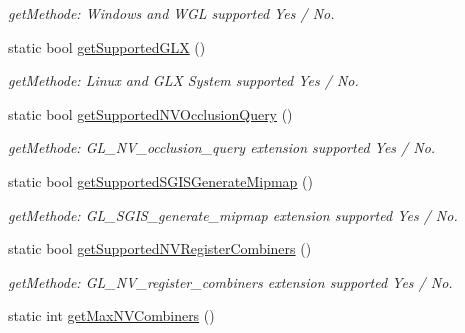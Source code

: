 \begin{DoxyCompactItemize}
\begin{DoxyCompactList}\small\item\em getMethode: Windows and WGL supported Yes / No. \item\end{DoxyCompactList}\item 
\hypertarget{class_f2_c_1_1_shader_g_l_a634e417f6f4511cbecf65fe077e6e740}{
static bool \hyperlink{class_f2_c_1_1_shader_g_l_a634e417f6f4511cbecf65fe077e6e740}{getSupportedGLX} ()}
\label{class_f2_c_1_1_shader_g_l_a634e417f6f4511cbecf65fe077e6e740}

\begin{DoxyCompactList}\small\item\em getMethode: Linux and GLX System supported Yes / No. \item\end{DoxyCompactList}\item 
\hypertarget{class_f2_c_1_1_shader_g_l_a429e826879c55f962e4e1553862b581e}{
static bool \hyperlink{class_f2_c_1_1_shader_g_l_a429e826879c55f962e4e1553862b581e}{getSupportedNVOcclusionQuery} ()}
\label{class_f2_c_1_1_shader_g_l_a429e826879c55f962e4e1553862b581e}

\begin{DoxyCompactList}\small\item\em getMethode: GL\_\-NV\_\-occlusion\_\-query extension supported Yes / No. \item\end{DoxyCompactList}\item 
\hypertarget{class_f2_c_1_1_shader_g_l_a76fce9d744e8ba46e6e8430caa0b07f4}{
static bool \hyperlink{class_f2_c_1_1_shader_g_l_a76fce9d744e8ba46e6e8430caa0b07f4}{getSupportedSGISGenerateMipmap} ()}
\label{class_f2_c_1_1_shader_g_l_a76fce9d744e8ba46e6e8430caa0b07f4}

\begin{DoxyCompactList}\small\item\em getMethode: GL\_\-SGIS\_\-generate\_\-mipmap extension supported Yes / No. \item\end{DoxyCompactList}\item 
\hypertarget{class_f2_c_1_1_shader_g_l_ab9f99c35299c767279edd40170b54df4}{
static bool \hyperlink{class_f2_c_1_1_shader_g_l_ab9f99c35299c767279edd40170b54df4}{getSupportedNVRegisterCombiners} ()}
\label{class_f2_c_1_1_shader_g_l_ab9f99c35299c767279edd40170b54df4}

\begin{DoxyCompactList}\small\item\em getMethode: GL\_\-NV\_\-register\_\-combiners extension supported Yes / No. \item\end{DoxyCompactList}\item 
\hypertarget{class_f2_c_1_1_shader_g_l_aafaf0c4fd8e004487143e2d6138ca256}{
static int \hyperlink{class_f2_c_1_1_shader_g_l_aafaf0c4fd8e004487143e2d6138ca256}{getMaxNVCombiners} ()}
\label{class_f2_c_1_1_shader_g_l_aafaf0c4fd8e004487143e2d6138ca256}


\end{DoxyCompactItemize}
